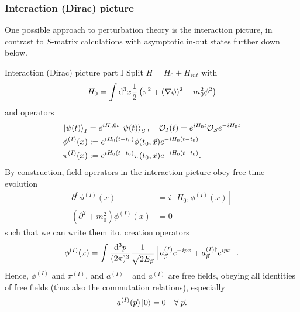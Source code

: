 \subsubsection{Interaction (Dirac) picture}
One possible approach to perturbation theory is the interaction picture, in contrast to $S$-matrix calculations with asymptotic in-out states further down below.
\begin{mybox}{Interaction (Dirac) picture part I}
	Split $H=H_0+H_{int}$ with
	\begin{equation}
		H_0 = \int \mathrm{d}^3 x \frac{1}{2} \left(\pi^2 + (\nabla \phi)^2+m^2_0 \phi^2\right)
	\end{equation}
	and operators
	\begin{align}
	\ket{\psi(t)}_I &= e^{iH_o0t} \ket{\psi(t)}_S,\quad \mathcal{O}_I(t) = e^{iH_0t} \mathcal{O}_S e^{-iH_0t}\\
	\phi^{(I)} (x) &:= e^{i H_0 (t-t_0)} \phi(t_0,\vec{x}) e^{-i H_0(t-t_0)} \\
	\pi^{(I)}(x) &:= e^{iH_0(t-t_0)} \pi(t_0,\vec{x}) e^{-i H_0(t-t_0)}.
	\end{align}
By construction, field operators in the interaction picture obey free time evolution
\begin{align}
	\label{eq:eomInteractionpicture}
	\partial^0 \phi^{(I)} (x) &= i \left[H_0,\phi^{(I)} (x)\right]\\
	(\partial^2+m^2_0) \phi^{(I)} (x) &=0
\end{align}
such that we can write them ito. creation operators
\begin{equation}
\phi^{(I)} (x) = \int \frac{\mathrm{d}^3 p}{(2 \pi)^3} \frac{1}{\sqrt{2 E_{\vec{p}}} }\left[a^{(I)}_{\vec{p}} e^{-ipx} + a^{(I)\dagger}_{\vec{p}} e^{ipx} \right].
\end{equation}
Hence, $\phi^{(I)}$ and $\pi^{(I)}$, and $a^{(I)\dagger}$ and $a^{(I)}$ are free fields, obeying all identities of free fields (thus also the commutation relations), especially
\begin{equation}
a^{(I)} (\vec{p}) \ket{0} = 0 \quad \forall \; \vec{p}.
\end{equation}
\end{mybox}
